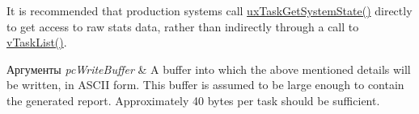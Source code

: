 It is recommended that production systems call \mbox{\hyperlink{task_8h_aa4603f3de3d809e9beb18d10fbac005d}{ux\+Task\+Get\+System\+State()}} directly to get access to raw stats data, rather than indirectly through a call to \mbox{\hyperlink{task_8h_ab87abc717f34ddced76802d12588a93d}{v\+Task\+List()}}.


\begin{DoxyParams}{Аргументы}
{\em pc\+Write\+Buffer} & A buffer into which the above mentioned details will be written, in A\+S\+C\+II form. This buffer is assumed to be large enough to contain the generated report. Approximately 40 bytes per task should be sufficient. \\
\hline
\end{DoxyParams}
